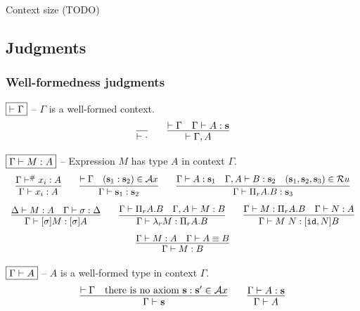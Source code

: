 \noindent
Context size (TODO)

\subsection{Judgments}

\subsubsection{Well-formedness judgments}

\noindent
$\boxed{\vdash \Gamma}$ -- $\Gamma$ is a well-formed context.
\[
\begin{array}{c}
  \infer{
    \wfctx \ctxempty
  }{
  }
  \qquad
  \infer{
    \wfctx {\ctxext \Gamma A}
  }{
    \wfctx \Gamma
    &
    \wfexp \Gamma A {\tmcst s}
  }
\end{array}
\]


\noindent
$\boxed{\Gamma \vdash M : A}$ -- Expression $M$ has type $A$ in context $\Gamma$.
\[
\begin{array}{c}
  \infer{
    \wfexp \Gamma {x_i} A
  }{
    \ctxlookup \Gamma {x_i} A
  }
  \qquad
  \infer{
    \wfexp \Gamma {\tmcst s_1} {\tmcst s_2}
  }{
    \wfctx \Gamma
    &
    (\tmcst s_1 : \tmcst s_2) \in \Ax
  }
  \qquad
  \infer{
    \wfexp \Gamma {\tppi A B} {\tmcst s_3}
  }{
    \wfexp \Gamma A {\tmcst s_1}
    &
    \wfexp {\ctxext \Gamma A} B {\tmcst s_2}
    &
    (\tmcst s_1, \tmcst s_2, \tmcst s_3) \in \Ru
  }
  \\[8pt]
  \infer{
    \wfexp \Gamma {\tmclo \sigma M} {\tmclo \sigma A}
  }{
    \wfexp \Delta M A
    &
    \wfsub \Gamma \sigma \Delta
  }
  \qquad
  \infer{
    \wfexp \Gamma {\tmlam M} {\tppi A B}
  }{
    \wftyp \Gamma \tppi A B
    &
    \wfexp {\ctxext \Gamma A} M B
  }
  \qquad
  \infer{
    \wfexp \Gamma {\tmapp M N} {\tmclo {\subext \subid N} B}
  }{
    \wfexp \Gamma M {\tppi A B}
    &
    \wfexp \Gamma N A
  }
  \\[8pt]
  \infer{
    \wfexp \Gamma M B
  }{
    \wfexp \Gamma M A
    &
    \eqtyp \Gamma A B
  }
\end{array}
\]


\noindent
$\boxed{\Gamma \vdash A}$ -- $A$ is a well-formed type in context $\Gamma$.
\[
\begin{array}{c}
  \infer{
    \wftyp \Gamma {\tmcst s}
  }{
    \wfctx \Gamma
    &
    \text{there is no axiom } \tmcst s : \tmcst s' \in \Ax
  }
  \qquad
  \infer{
    \wftyp \Gamma A
  }{
    \wfexp \Gamma A {\tmcst s}
  }
\end{array}
\]


